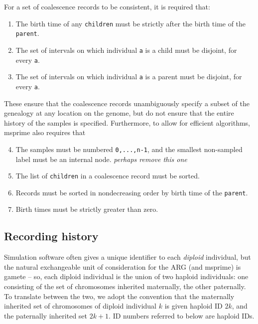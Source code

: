 \documentclass{bioinfo}
\newcommand{\plr}[1]{{\color{blue}\it #1}}
\begin{document}
\begin{methods}
For a set of coalescence records to be consistent,
it is required that:
\begin{enumerate}
    \item The birth time of any \texttt{children} must be strictly after the birth time of the \texttt{parent}.
    \item The set of intervals on which individual \texttt{a} is a child must be disjoint, for every \texttt{a}.
    \item The set of intervals on which individual \texttt{a} is a parent must be disjoint, for every \texttt{a}.
\end{enumerate}
These ensure that the coalescence records unambiguously specify a subset of the genealogy at any location on the genome,
but do not ensure that the entire history of the samples is specified.
Furthermore, to allow for efficient algorithms, msprime also requires that
\begin{enumerate} \setcounter{enumi}{3}
    \item The samples must be numbered \texttt{0,...,n-1}, and the smallest non-sampled label must be an internal node.
        \plr{perhaps remove this one}
    \item The list of \texttt{children} in a coalescence record must be sorted.
    \item Records must be sorted in nondecreasing order by birth time of the \texttt{parent}.
    \item Birth times must be strictly greater than zero.
\end{enumerate}

\subsection{Recording history}

Simulation software often gives a unique identifier to each \emph{diploid} individual,
but the natural exchangeable unit of consideration for the ARG (and msprime) is gamete --
so, each diploid individual is the union of two haploid individuals: 
one consisting of the set of chromosomes inherited maternally, the other paternally.
To translate between the two,
we adopt the convention that the maternally inherited set of chromosomes of diploid individual $k$
is given haploid ID $2k$, and the paternally inherited set $2k+1$.
ID numbers referred to below are haploid IDs.


\end{methods}
\end{document}
